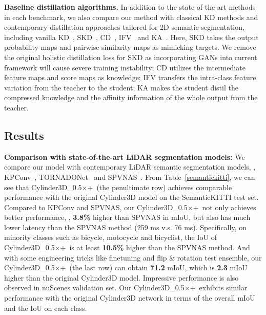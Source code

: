 \noindent \textbf{Baseline distillation algorithms.} In addition to the state-of-the-art methods in each benchmark, we also compare our method with classical KD methods and contemporary distillation approaches tailored for 2D semantic segmentation, including vanilla KD~\cite{hinton2015distilling}, SKD~\cite{liu2019structured}, CD~\cite{shu2020channel}, IFV~\cite{wang2020intra} and KA~\cite{he2019knowledge}. Here, SKD takes the output probability maps and pairwise similarity maps as mimicking targets. We remove the original holistic distillation loss for SKD as incorporating GANs into current framework will cause severe training instability; CD utilizes the intermediate feature maps and score maps as knowledge; IFV transfers the intra-class feature variation from the teacher to the student; KA makes the student distil the compressed knowledge and the affinity information of the whole output from the teacher.



\subsection{Results}



\noindent \textbf{Comparison with state-of-the-art LiDAR segmentation models:} We compare our model with contemporary LiDAR semantic segmentation models, \eg, KPConv~\cite{thomas2019kpconv}, TORNADONet~\cite{gerdzhev2021tornado} and SPVNAS~\cite{tang2020searching}. From Table~\ref{semantickitti}, we can see that Cylinder3D\_0.5$\times$+\algorithmname~(the penultimate row) achieves comparable performance with the original Cylinder3D model on the SemanticKITTI test set. Compared to KPConv and SPVNAS, our Cylinder3D\_0.5$\times$+\algorithmname~not only achieves better performance, \eg, \textbf{3.8\%} higher than SPVNAS in mIoU, but also has much lower latency than the SPVNAS method (259 ms v.s. 76 ms). Specifically, on minority classes such as bicycle, motocycle and bicyclist, the IoU of Cylinder3D\_0.5$\times$+\algorithmname~is at least \textbf{10.5\%} higher than the SPVNAS method. And with some engineering tricks like finetuning and flip \& rotation test ensemble, our Cylinder3D\_0.5$\times$+\algorithmname~(the last row) can obtain \textbf{71.2} mIoU, which is \textbf{2.3} mIoU higher than the original Cylinder3D model. Impressive performance is also observed in nuScenes validation set. Our Cylinder3D\_0.5$\times$+\algorithmname~exhibits similar performance with the original Cylinder3D network in terms of the overall mIoU and the IoU on each class.

